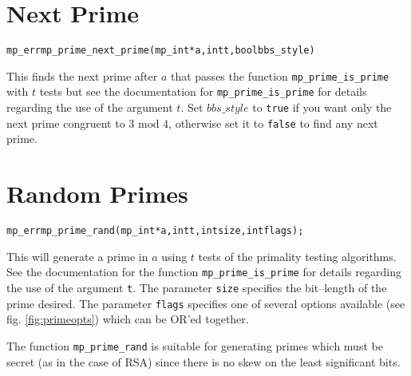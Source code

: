 \documentclass[synpaper]{book}
\begin{document}
\section{Next Prime}
\begin{alltt}
mp_err mp_prime_next_prime(mp_int *a, int t, bool bbs_style)
\end{alltt}
This finds the next prime after $a$ that passes the function \texttt{mp\_prime\_is\_prime} with $t$
tests but see the documentation for \texttt{mp\_prime\_is\_prime} for details regarding the use of
the argument $t$.  Set $bbs\_style$ to \texttt{true} if you want only the next prime congruent
to $3 \mbox{ mod } 4$, otherwise set it to \texttt{false} to find any next prime.

\section{Random Primes}
\begin{alltt}
mp_err mp_prime_rand(mp_int *a, int t, int size, int flags);
\end{alltt}
This will generate a prime in $a$ using $t$ tests of the primality testing algorithms. See the
documentation for the function \texttt{mp\_prime\_is\_prime} for details regarding the use of the
argument \texttt{t}. The parameter \texttt{size} specifies the bit--length of the prime desired.
The parameter \texttt{flags} specifies one of several options available (see fig.
\ref{fig:primeopts}) which can be OR'ed together.

The function \texttt{mp\_prime\_rand} is suitable for generating primes which must be secret (as in
the case of RSA) since there is no skew on the least significant bits.
\end{document}
